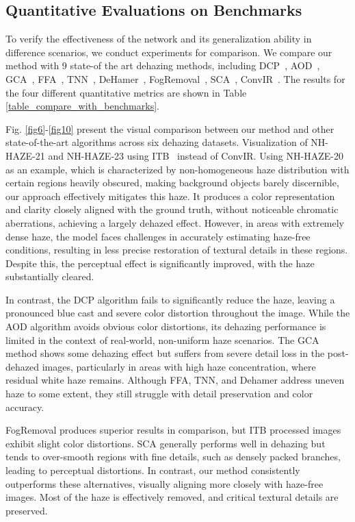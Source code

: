 \documentclass[journal]{IEEEtran}
\begin{document}
\subsection{Quantitative Evaluations on Benchmarks}
To verify the effectiveness of the network and its generalization ability in difference scenarios, we conduct experiments for comparison. We compare our method with 9 state-of the art dehazing methods, including DCP~\cite{he2010single}, AOD~\cite{li2017aod}, GCA~\cite{chen2019gated}, FFA~\cite{qin2020ffa}, TNN~\cite{yu2021two}, DeHamer~\cite{guo2022image}, FogRemoval~\cite{jin2022structure}, SCA~\cite{guo2023scanet}, ConvIR~\cite{cui2024revitalizing}. The results for the four different quantitative metrics are shown in Table \ref{table_compare_with_benchmarks}.

Fig. \ref{fig6}-\ref{fig10} present the visual comparison between our method and other state-of-the-art algorithms across six dehazing datasets. Visualization of NH-HAZE-21 and NH-HAZE-23 using ITB~\cite{liu2023data} instead of ConvIR. Using NH-HAZE-20 as an example, which is characterized by non-homogeneous haze distribution with certain regions heavily obscured, making background objects barely discernible, our approach effectively mitigates this haze. It produces a color representation and clarity closely aligned with the ground truth, without noticeable chromatic aberrations, achieving a largely dehazed effect. However, in areas with extremely dense haze, the model faces challenges in accurately estimating haze-free conditions, resulting in less precise restoration of textural details in these regions. Despite this, the perceptual effect is significantly improved, with the haze substantially cleared.

In contrast, the DCP algorithm fails to significantly reduce the haze, leaving a pronounced blue cast and severe color distortion throughout the image. While the AOD algorithm avoids obvious color distortions, its dehazing performance is limited in the context of real-world, non-uniform haze scenarios. The GCA method shows some dehazing effect but suffers from severe detail loss in the post-dehazed images, particularly in areas with high haze concentration, where residual white haze remains. Although FFA, TNN, and Dehamer address uneven haze to some extent, they still struggle with detail preservation and color accuracy.

FogRemoval produces superior results in comparison, but ITB processed images exhibit slight color distortions. SCA generally performs well in dehazing but tends to over-smooth regions with fine details, such as densely packed branches, leading to perceptual distortions. In contrast, our method consistently outperforms these alternatives, visually aligning more closely with haze-free images. Most of the haze is effectively removed, and critical textural details are preserved.
\end{document}
